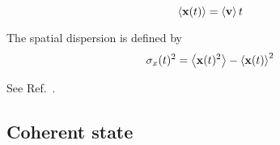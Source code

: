 \begin{example}
	\begin{equation}
		\expval{\vb{x}(t)}
		=
		\expval{\vb{v}}t
	\end{equation}	
\end{example}
\begin{definition}
	The spatial dispersion is defined by
	\begin{equation}
		\sigma_x(t)^2
		=
		\expval{\vb{x}(t)^2}
		-
		\expval{\vb{x}(t)}^2		
	\end{equation}
\end{definition}
\begin{example}
	See Ref.~\cite{Naumov2013}.
\end{example}

\subsection{Coherent state}

